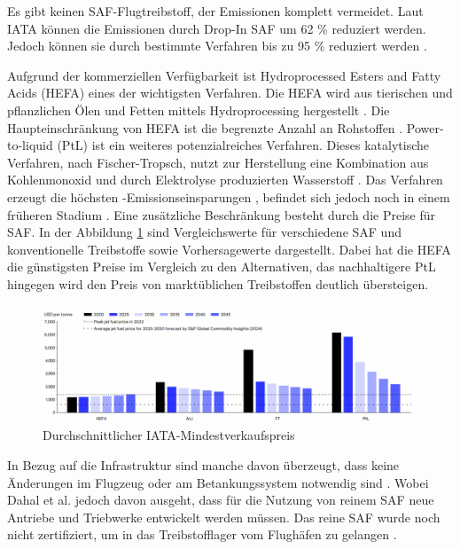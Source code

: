 Es gibt keinen SAF-Flugtreibstoff, der Emissionen komplett vermeidet. 
Laut IATA können die Emissionen durch Drop-In SAF um 62 \% reduziert werden.
Jedoch können sie durch bestimmte Verfahren bis zu 95 \% reduziert werden \cite{icao_saf_conversion_2024}.


 
Aufgrund der kommerziellen Verfügbarkeit ist Hydroprocessed Esters and Fatty Acids (HEFA) eines der wichtigsten Verfahren.
Die HEFA wird aus tierischen und pflanzlichen Ölen und Fetten mittels Hydroprocessing hergestellt \cite{bauen2020sustainable}. 
Die Haupteinschränkung von HEFA ist die begrenzte Anzahl an Rohstoffen \cite{bauen2020sustainable}.
Power-to-liquid (PtL) ist ein weiteres potenzialreiches Verfahren.
Dieses katalytische Verfahren, nach Fischer-Tropsch, nutzt zur Herstellung eine Kombination aus 
Kohlenmonoxid  und durch Elektrolyse produzierten Wasserstoff  \cite{bauen2020sustainable}.
Das Verfahren erzeugt die höchsten -Emissionseinsparungen \cite{de2017life}, 
befindet sich jedoch noch in einem früheren Stadium \cite{bauen2020sustainable}.
Eine zusätzliche Beschränkung besteht durch die Preise für SAF. 
In der Abbildung \ref{safpreis} sind Vergleichswerte für verschiedene SAF 
und konventionelle Treibstoffe sowie Vorhersagewerte dargestellt.
Dabei hat die HEFA die günstigsten Preise im Vergleich zu den Alternativen, 
das nachhaltigere PtL hingegen wird den Preis von marktüblichen Treibstoffen deutlich übersteigen.

\begin{figure}[h]
	\centering
	\includegraphics[width=0.8\linewidth]{Bilder/Preise SAF.png}
	\caption[Durchschnittlicher IATA-Mindestverkaufspreis (MSP) der wichtigsten SAF-Pfade über den Zeitraum 2020 bis 2050]{Durchschnittlicher IATA-Mindestverkaufspreis \cite{icao_saf_conversion_2024}}
	\label{safpreis}
\end{figure}
In Bezug auf die Infrastruktur sind manche davon überzeugt, dass keine Änderungen im Flugzeug oder am Betankungssystem notwendig sind \cite{sky2020hydrogen}. %
Wobei Dahal et al. \cite{dahal2021techno} jedoch davon ausgeht, dass für die Nutzung von reinem SAF neue Antriebe und Triebwerke entwickelt werden müssen.
Das reine SAF wurde noch nicht zertifiziert, um in das Treibstofflager vom Flughäfen zu gelangen \cite{iata_saf_2024}.


